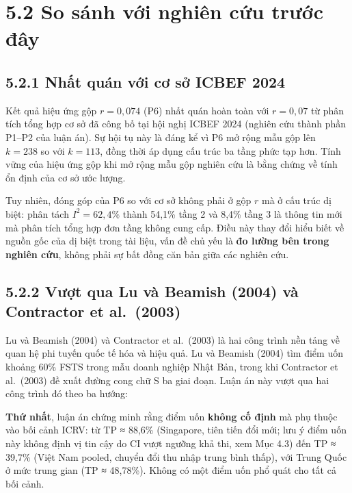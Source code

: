 \documentclass[
  a4paper,
  13pt]{extreport}
\begin{document}
\hypertarget{so-suxe1nh-vux1edbi-nghiuxean-cux1ee9u-trux1b0ux1edbc-ux111uxe2y}{%
\section{5.2 So sánh với nghiên cứu trước
đây}\label{so-suxe1nh-vux1edbi-nghiuxean-cux1ee9u-trux1b0ux1edbc-ux111uxe2y}}

\hypertarget{nhux1ea5t-quuxe1n-vux1edbi-cux1a1-sux1edf-icbef-2024}{%
\subsection{5.2.1 Nhất quán với cơ sở ICBEF
2024}\label{nhux1ea5t-quuxe1n-vux1edbi-cux1a1-sux1edf-icbef-2024}}

Kết quả hiệu ứng gộp \(r = 0{,}074\) (P6) nhất quán hoàn toàn với
\(r = 0{,}07\) từ phân tích tổng hợp cơ sở đã công bố tại hội nghị ICBEF
2024 (nghiên cứu thành phần P1--P2 của luận án). Sự hội tụ này là đáng
kể vì P6 mở rộng mẫu gộp lên \(k = 238\) so với \(k = 113\), đồng thời
áp dụng cấu trúc ba tầng phức tạp hơn. Tính vững của hiệu ứng gộp khi mở
rộng mẫu gộp nghiên cứu là bằng chứng về tính ổn định của cơ sở ước
lượng.

Tuy nhiên, đóng góp của P6 so với cơ sở không phải ở gộp \(r\) mà ở cấu
trúc dị biệt: phân tách \(I^2 = 62{,}4\%\) thành 54,1\% tầng 2 và 8,4\%
tầng 3 là thông tin mới mà phân tích tổng hợp đơn tầng không cung cấp.
Điều này thay đổi hiểu biết về nguồn gốc của dị biệt trong tài liệu, vấn
đề chủ yếu là \textbf{đo lường bên trong nghiên cứu}, không phải sự bất
đồng căn bản giữa các nghiên cứu.

\hypertarget{vux1b0ux1ee3t-qua-lu-vuxe0-beamish-2004-vuxe0-contractor-et-al.-2003}{%
\subsection{5.2.2 Vượt qua Lu và Beamish (2004) và Contractor et
al.~(2003)}\label{vux1b0ux1ee3t-qua-lu-vuxe0-beamish-2004-vuxe0-contractor-et-al.-2003}}

Lu và Beamish (2004) và Contractor et al.~(2003) là hai công trình nền
tảng về quan hệ phi tuyến quốc tế hóa và hiệu quả. Lu và Beamish (2004)
tìm điểm uốn khoảng 60\% FSTS trong mẫu doanh nghiệp Nhật Bản, trong khi
Contractor et al.~(2003) đề xuất đường cong chữ S ba giai đoạn. Luận án
này vượt qua hai công trình đó theo ba hướng:

\textbf{Thứ nhất}, luận án chứng minh rằng điểm uốn \textbf{không cố
định} mà phụ thuộc vào bối cảnh ICRV: từ TP ≈ 88,6\% (Singapore, tiên
tiến đổi mới; lưu ý điểm uốn này không định vị tin cậy do CI vượt ngưỡng
khả thi, xem Mục 4.3) đến TP ≈ 39,7\% (Việt Nam pooled, chuyển đổi thu
nhập trung bình thấp), với Trung Quốc ở mức trung gian (TP ≈ 48,78\%).
Không có một điểm uốn phổ quát cho tất cả bối cảnh.
\end{document}
